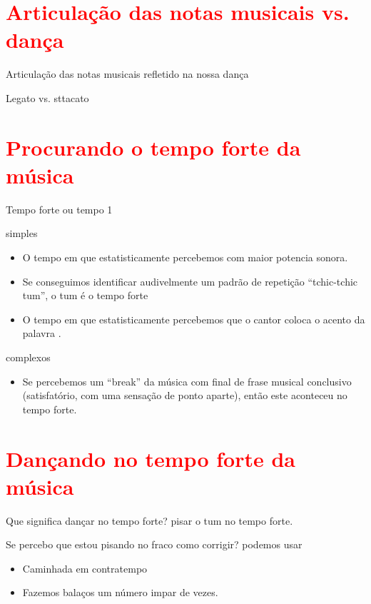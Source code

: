 \section{\textcolor{red}{Articulação das notas musicais vs. dança}}
Articulação das notas musicais refletido na nossa dança

Legato vs. sttacato

\section{\textcolor{red}{Procurando o tempo forte da música}}
Tempo forte ou tempo 1

simples
\begin{itemize}
\item O tempo em que estatisticamente percebemos com maior potencia sonora. 
\item Se conseguimos identificar audivelmente um padrão de repetição ``tchic-tchic tum'', o tum é o tempo forte
\item O tempo em que estatisticamente percebemos que o cantor  coloca o acento da palavra \cite[pp. 149]{medteoria}. 
\end{itemize}

complexos 
\begin{itemize}
\item Se percebemos um ``break'' da música com final de frase musical conclusivo 
(satisfatório, com uma sensação de ponto aparte), então este aconteceu no tempo forte.
\end{itemize}

\section{\textcolor{red}{Dançando no tempo forte da música}}

Que significa dançar no tempo forte? 
pisar o tum  no tempo forte.

Se percebo que estou pisando no fraco como corrigir?
podemos usar
\begin{itemize}
\item Caminhada em contratempo
\item Fazemos balaços um número impar de vezes.
\end{itemize}


